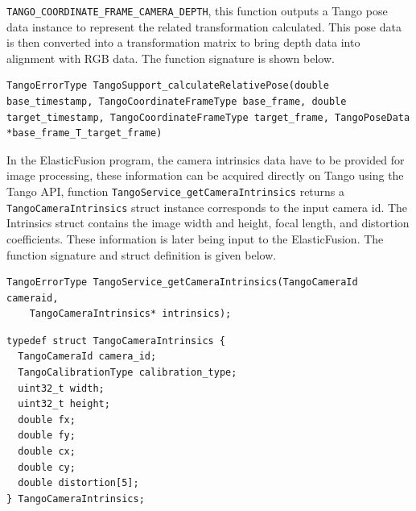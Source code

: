 \documentclass[12pt,twoside]{article}
\begin{document}
\verb|TANGO_COORDINATE_FRAME_CAMERA_DEPTH|, this function outputs a Tango pose data instance to represent the related transformation calculated. This pose data is then converted into a transformation matrix to bring depth data into alignment with RGB data. The function signature is shown below.\\
\begin{lstlisting}
TangoErrorType TangoSupport_calculateRelativePose(double base_timestamp, TangoCoordinateFrameType base_frame, double target_timestamp, TangoCoordinateFrameType target_frame, TangoPoseData *base_frame_T_target_frame)
\end{lstlisting}
In the ElasticFusion program, the camera intrinsics data have to be provided for image processing, these information can be acquired directly on Tango using the Tango API, function \verb|TangoService_getCameraIntrinsics| returns a \verb|TangoCameraIntrinsics| struct instance corresponds to the input camera id. The Intrinsics struct contains the image width and height, focal length, and distortion coefficients. These information is later being input to the ElasticFusion. The function signature and struct definition is given below.\\
\begin{lstlisting}
TangoErrorType TangoService_getCameraIntrinsics(TangoCameraId cameraid,
    TangoCameraIntrinsics* intrinsics);
\end{lstlisting}
\begin{lstlisting}
typedef struct TangoCameraIntrinsics {
  TangoCameraId camera_id;
  TangoCalibrationType calibration_type;
  uint32_t width;
  uint32_t height;
  double fx;
  double fy;
  double cx;
  double cy;
  double distortion[5];
} TangoCameraIntrinsics;
\end{lstlisting}

\newpage
\end{document}
